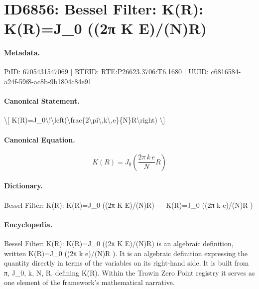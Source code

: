\section*{ID6856: Bessel Filter: K(R): K(R)=J\_0 ((2π K E)/(N)R)}
\paragraph{Metadata.}
PiID: 6705431547069 | RTEID: RTE:P26623.3706:T6.1680 | UUID: c6816584-a24f-59f8-ac8b-9b1804c84e91

\paragraph{Canonical Statement.}
\textbackslash{}[ K(R)=J\_0\textbackslash{}!\textbackslash{}left(\textbackslash{}frac\{2\textbackslash{}pi\textbackslash{},k\textbackslash{},e\}\{N\}R\textbackslash{}right) \textbackslash{}]

\paragraph{Canonical Equation.}
\[
K(R)=J_0\!\left(\frac{2\pi\,k\,e}{N}R\right)
\]

\paragraph{Dictionary.}
Bessel Filter: K(R): K(R)=J\_0 ((2π K E)/(N)R) — K(R)=J\_0 ((2π k e)/(N)R )

\paragraph{Encyclopedia.}
Bessel Filter: K(R): K(R)=J\_0 ((2π K E)/(N)R) is an algebraic definition, written K(R)=J\_0 ((2π k e)/(N)R ). It is an algebraic definition expressing the quantity directly in terms of the variables on its right-hand side. It is built from π, J\_0, k, N, R, defining K(R). Within the Trawin Zero Point registry it serves as one element of the framework's mathematical narrative.
